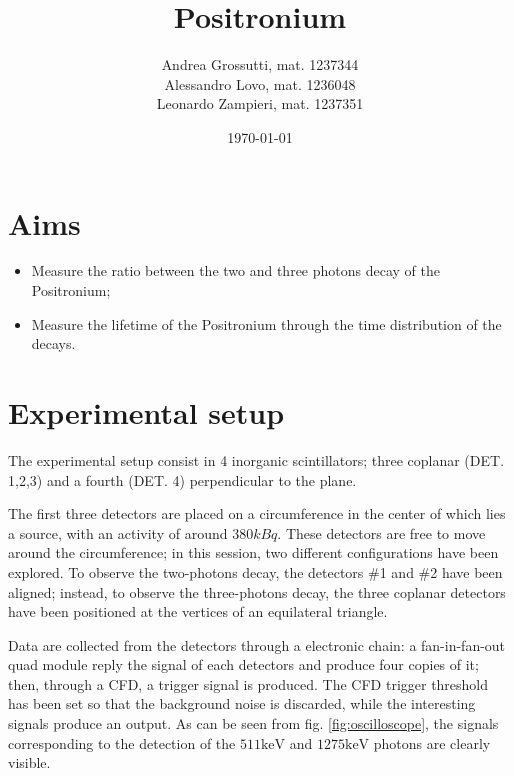 \documentclass[11pt,a4 paper]{article}
\title{Positronium}
\author{Andrea Grossutti, mat. 1237344\\Alessandro Lovo, mat. 1236048\\Leonardo Zampieri, mat. 1237351}
\date{\today}
\begin{document}
\maketitle

\section{Aims}
\begin{itemize}
    \item Measure the ratio between the two and three photons decay of the Positronium;
    \item Measure the lifetime of the Positronium through the time distribution of the decays.
\end{itemize}



\section{Experimental setup}
The experimental setup consist in 4 inorganic scintillators; three coplanar (DET. 1,2,3) and a fourth (DET. 4) perpendicular to the plane.

The first three detectors are placed on a circumference in the center of which lies a  source, with an activity of around $380\si{kBq}$. These detectors are free to move around the circumference; in this session, two different configurations have been explored. To observe the two-photons decay, the detectors \#1 and \#2 have been aligned; instead, to observe the three-photons decay, the three coplanar detectors have been positioned at the vertices of an equilateral triangle.

Data are collected from the detectors through a electronic chain: a fan-in-fan-out quad module reply the signal of each detectors and produce four copies of it; then, through a CFD, a trigger signal is produced.  The CFD trigger threshold has been set so that the background noise is discarded, while the interesting signals produce an output. As can be seen from fig. \ref{fig:oscilloscope}, the signals corresponding to the detection of the $511\si{\kilo\electronvolt}$ and $1275\si{\kilo\electronvolt}$ photons are clearly visible.
\end{document}

